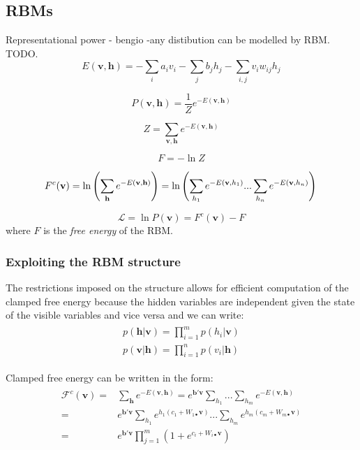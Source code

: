 \documentclass[../report/report.tex]{subfiles}
\begin{document}
\subsection{RBMs}
Representational power - bengio -any distibution can be modelled by RBM. TODO.
$$ E (\mathbf{v,h}) = - \sum_i a_i v_i - \sum_j b_j h_j - \sum_{i,j} v_i w_{ij}h_j$$

$$ P(\mathbf{v, h}) = \frac{1}{Z} e^{-E(\mathbf{v,h})}
$$

$$ Z  =  \sum_{\mathbf{v,h}} e^{-E(\mathbf{v,h})} $$

$$ F = - \ln Z $$

$$ F^c (\mathbf{v}) = \ln \left( \sum_{\mathbf{h}} e^{-E(\mathbf{v,h})} \right)= \ln \left( \sum_{h_1} e^{-E(\mathbf{v},h_1)}  ...  \sum_{h_n} e^{-E(\mathbf{v},h_n)} \right) \\
$$

$$\mathcal{L} = \ln P(\mathbf{v}) = F^c(\mathbf{v}) - F$$
where $F$ is the \emph{free energy} of the RBM.

\subsubsection{Exploiting the RBM structure}
The restrictions imposed on the structure allows for efficient computation of the clamped free energy because the hidden variables are independent given the state of the visible variables and vice versa and we can write:
\begin{align}
\begin{split}
p(\mathbf{h}| \mathbf{v}) = \prod_{i = 1}^{m} p(h_i |\mathbf{v}) \\
p(\mathbf{v}| \mathbf{h}) = \prod_{i = 1}^{n} p(v_i |\mathbf{h})
\end{split}
\end{align}

Clamped free energy can be written in the form:
\begin{align}
\begin{split}
\mathcal{F}^c(\mathbf{v}) = & \sum_\mathbf{h} e^{-E(\mathbf{v}, \mathbf{h})} = e^{\mathbf{b}'\mathbf{v}}\sum_{h_1}...\sum_{h_m}e^{-E(\mathbf{v}, \mathbf{h})} \\
=&  e^{\mathbf{b}'\mathbf{v}} \sum_{h_1} e^{h_1 (c_1 + W_{1\bullet}\mathbf{v})}... \sum_{h_m} e^{h_m (c_m + W_{m\bullet}\mathbf{v})} \\
= & e^{\mathbf{b}'\mathbf{v}} \prod_{j=1}^{m} \left( 1 + e^{c_i + W_{i\bullet}\mathbf{v}} \right)
\label{eq:freeEnergy}
\end{split}
\end{align}
\end{document}
